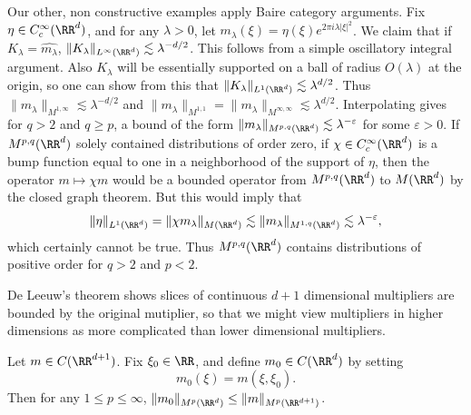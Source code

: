 \begin{example}
    Our other, non constructive examples apply Baire category arguments. Fix $\eta \in C_c^\infty(\RR^d)$, and for any $\lambda > 0$, let $m_\lambda(\xi) = \eta(\xi) e^{2 \pi i \lambda |\xi|^2}$. We claim that if $K_\lambda = \widehat{m_\lambda}$, $\| K_\lambda \|_{L^\infty(\RR^d)} \lesssim \lambda^{-d/2}$. This follows from a simple oscillatory integral argument. Also $K_\lambda$ will be essentially supported on a ball of radius $O(\lambda)$ at the origin, so one can show from this that $\| K_\lambda \|_{L^1(\RR^d)} \lesssim \lambda^{d/2}$. Thus $\| m_\lambda \|_{M^{1,\infty}} \lesssim \lambda^{-d/2}$ and $\| m_\lambda \|_{M^{1,1}} = \| m_\lambda \|_{M^{\infty,\infty}} \lesssim \lambda^{d/2}$. Interpolating gives for $q > 2$ and $q \geq p$, a bound of the form $\| m_\lambda \|_{M^{p,q}(\RR^d)} \lesssim \lambda^{-\varepsilon}$ for some $\varepsilon > 0$. If $M^{p,q}(\RR^d)$ solely contained distributions of order zero, if $\chi \in C_c^\infty(\RR^d)$ is a bump function equal to one in a neighborhood of the support of $\eta$, then the operator $m \mapsto \chi m$ would be a bounded operator from $M^{p,q}(\RR^d)$ to $M(\RR^d)$ by the closed graph theorem. But this would imply that
    \[ \| \eta \|_{L^1(\RR^d)} = \| \chi m_\lambda \|_{M(\RR^d)} \lesssim \| m_\lambda \|_{M^{1,q}(\RR^d)} \lesssim \lambda^{-\varepsilon}, \]
    which certainly cannot be true. Thus $M^{p,q}(\RR^d)$ contains distributions of positive order for $q > 2$ and $p < 2$.
\end{example}

De Leeuw's theorem shows slices of continuous $d+1$ dimensional multipliers are bounded by the original mutiplier, so that we might view multipliers in higher dimensions as more complicated than lower dimensional multipliers.

\begin{theorem}
  Let $m \in C(\RR^{d+1})$. Fix $\xi_0 \in \RR$, and define $m_0 \in C(\RR^d)$ by setting
  \[ m_0(\xi) = m(\xi,\xi_0). \]
  Then for any $1 \leq p \leq \infty$, $\| m_0 \|_{M^p(\RR^d)} \leq \| m \|_{M^p(\RR^{d+1})}$.
\end{theorem}

